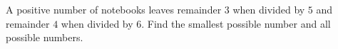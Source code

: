 A positive number of notebooks leaves remainder $3$ when divided by $5$ and remainder $4$ when divided by $6$. Find the smallest possible number and all possible numbers.
